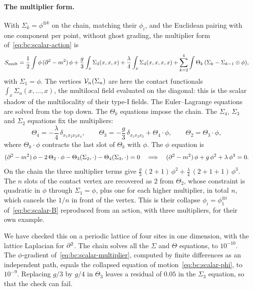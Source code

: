\paragraph{The multiplier form.}
With $\Sigma_k = \phi^{\otimes k}$ on the chain, matching their $\phi_i$, and the Euclidean pairing with one component per point, without ghost grading, the multiplier form of~\eqref{eq:bc:scalar-action} is
\begin{equation}
  \label{eq:bc:scalar-multiplier}
  S_{\mathrm{mult}}
    = \frac{1}{2} \int \phi \, (\partial^2 - m^2) \, \phi
      + \frac{g}{3} \int_x \Sigma_3(x, x, x)
      + \frac{\lambda}{4} \int_x \Sigma_4(x, x, x, x)
      + \sum_{k = 2}^4 \int \Theta_k \, (\Sigma_k - \Sigma_{k-1} \otimes \phi),
\end{equation}
with $\Sigma_1 = \phi$.
The vertices $\mathcal{V}_{n}(\Sigma_n)$ are here the contact functionals $\int_x \Sigma_n(x, \ldots, x)$, the multilocal field evaluated on the diagonal: this is the scalar shadow of the multilocality of their type-I fields.
The Euler--Lagrange equations are solved from the top down.
The $\Theta_k$ equations impose the chain.
The $\Sigma_4$, $\Sigma_3$ and $\Sigma_2$ equations fix the multipliers:
\begin{equation}
  \Theta_4
    = - \frac{\lambda}{4} \, \delta_{x_1 x_2 x_3 x_4},
  \qquad
  \Theta_3
    = - \frac{g}{3} \, \delta_{x_1 x_2 x_3} + \Theta_4 \cdot \phi,
  \qquad
  \Theta_2
    = \Theta_3 \cdot \phi,
\end{equation}
where $\Theta_k \cdot \phi$ contracts the last slot of $\Theta_k$ with $\phi$.
The $\phi$ equation is
\begin{equation}
  \label{eq:bc:scalar-phi}
  (\partial^2 - m^2) \, \phi
    - 2 \, \Theta_2 \cdot \phi
    - \Theta_3(\Sigma_2, \cdot)
    - \Theta_4(\Sigma_3, \cdot)
    = 0
  \quad \Longrightarrow \quad
  (\partial^2 - m^2) \, \phi + g \, \phi^2 + \lambda \, \phi^3
    = 0.
\end{equation}
On the chain the three multiplier terms give $\tfrac{g}{3} \, (2 + 1) \, \phi^2 + \tfrac{\lambda}{4} \, (2 + 1 + 1) \, \phi^3$.
The $n$ slots of the contact vertex are recovered as $2$ from $\Theta_2$, whose constraint is quadratic in $\phi$ through $\Sigma_1 = \phi$, plus one for each higher multiplier, in total $n$, which cancels the $1/n$ in front of the vertex.
This is their collapse $\phi_i = \phi_1^{\otimes i}$ of~\eqref{eq:bc:scalar-B} reproduced from an action, with three multipliers, for their own example.

We have checked this on a periodic lattice of four sites in one dimension, with the lattice Laplacian for $\partial^2$.
The chain solves all the $\Sigma$ and $\Theta$ equations, to $10^{-10}$.
The $\phi$-gradient of~\eqref{eq:bc:scalar-multiplier}, computed by finite differences as an independent path, equals the collapsed equation of motion~\eqref{eq:bc:scalar-phi}, to $10^{-9}$.
Replacing $g / 3$ by $g / 4$ in $\Theta_3$ leaves a residual of $0.05$ in the $\Sigma_3$ equation, so that the check can fail.

